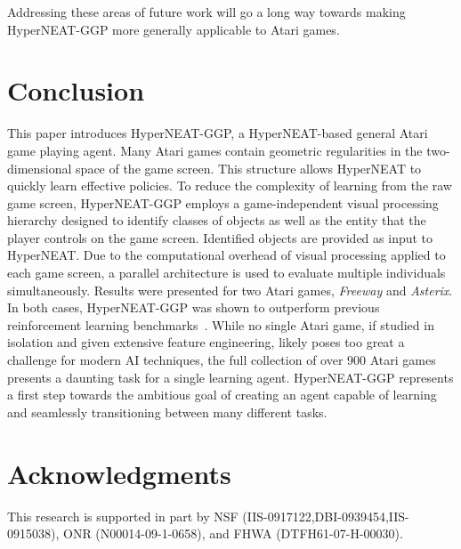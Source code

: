 \documentclass{sig-alternate}
\begin{document}
Addressing these areas of future work will go a long way towards making HyperNEAT-GGP more generally applicable to Atari games.

\section{Conclusion}
\label{sec:conclusion}
This paper introduces HyperNEAT-GGP, a HyperNEAT-based general Atari game playing agent. Many Atari games contain geometric regularities in the two-dimensional space of the game screen. This structure allows HyperNEAT to quickly learn effective policies. To reduce the complexity of learning from the raw game screen, HyperNEAT-GGP employs a game-independent visual processing hierarchy designed to identify classes of objects as well as the entity that the player controls on the game screen. Identified objects are provided as input to HyperNEAT. Due to the computational overhead of visual processing applied to each game screen, a parallel architecture is used to evaluate multiple individuals simultaneously. Results were presented for two Atari games, \textit{Freeway} and \textit{Asterix}. In both cases, HyperNEAT-GGP was shown to outperform previous reinforcement learning benchmarks~\cite{naddaf10}. While no single Atari game, if studied in isolation and given extensive feature engineering, likely poses too great a challenge for modern AI techniques, the full collection of over 900 Atari games presents a daunting task for a single learning agent. HyperNEAT-GGP represents a first step towards the ambitious goal of creating an agent capable of learning and seamlessly transitioning between many different tasks.

\section{Acknowledgments}
This research is supported in part by NSF (IIS-0917122,DBI-0939454,IIS-0915038), ONR (N00014-09-1-0658), and FHWA (DTFH61-07-H-00030).


\end{document}
